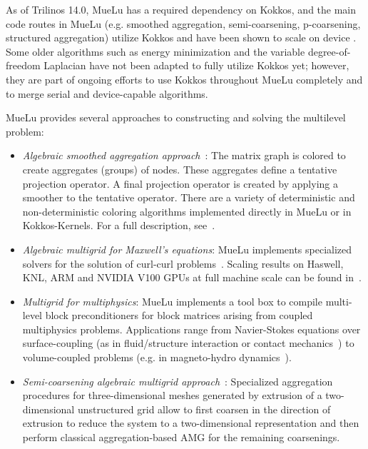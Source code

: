 As of Trilinos 14.0, MueLu has a required dependency on Kokkos,
and the main code routes in MueLu (e.g. smoothed aggregation, semi-coarsening, p-coarsening, structured aggregation)
utilize Kokkos and have been shown to scale on device .
Some older algorithms such as energy minimization and the variable degree-of-freedom Laplacian have not been adapted to fully utilize Kokkos yet;
however, they are part of ongoing efforts to use Kokkos throughout MueLu completely and to merge serial and device-capable algorithms.

MueLu provides several approaches to constructing and solving the multilevel problem:

\begin{itemize}
\item \emph{Algebraic smoothed aggregation approach}~\cite{Vanek1996a}:
The matrix graph is colored to create aggregates (groups) of nodes.
These aggregates define a tentative projection operator.
A final projection operator is created by applying a smoother to the tentative operator.
There are a variety of deterministic and non-deterministic coloring algorithms implemented directly
in MueLu or in Kokkos-Kernels.  For a full description, see~\cite{BergerVergiat2023a}.

\item \emph{Algebraic multigrid for Maxwell’s equations}:
  MueLu implements specialized solvers for the solution of curl-curl problems~\cite{BochevHuEtAl2008_AlgebraicMultigridApproachBased}.
  Scaling results on Haswell, KNL, ARM and NVIDIA V100 GPUs at full machine scale can be found in~\cite{BettencourtBrownEtAl2021_EmpirePic}.

\item \emph{Multigrid for multiphysics}:
MueLu implements a tool box to compile multi-level block preconditioners for block matrices arising from coupled multiphysics problems.
Applications range from Navier-Stokes equations
over surface-coupling (as in fluid/structure interaction or contact mechanics~\cite{Wiesner2021a})
to volume-coupled problems (e.g. in magneto-hydro dynamics~\cite{Ohm2022a}).

\item \emph{Semi-coarsening algebraic multigrid approach}~\cite{Tuminaro2016a}:
Specialized aggregation procedures for three-dimensional meshes generated by extrusion of a two-dimensional unstructured grid
allow to first coarsen in the direction of extrusion to reduce the system to a two-dimensional representation and then perform classical aggregation-based AMG
for the remaining coarsenings.


\end{itemize}
